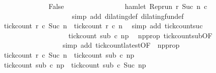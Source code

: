 \begin{isabellebody}
\ \ \ \ \ \ \ \ \ \ \ \ \isamarkupfalse%
\ False\ %
\isanewline
\ \ \ \ \ \ \ \ \ \ \ \ \ \ \isamarkupfalse%
\ {\isacartoucheopen}{\isasymnot}hamlet\ {\isacharparenleft}{\isacharparenleft}Rep{\isacharunderscore}run\ r{\isacharparenright}\ {\isacharparenleft}Suc\ n{\isacharparenright}\ c\isanewline
\ \ \ \ \ \ \ \ \ \ \ \ \ \ \ \ \isamarkupfalse%
\ {\isacharasterisk}\ \isamarkupfalse%
\ {\isacharparenleft}simp\ add{\isacharcolon}\ dilating{\isacharunderscore}def\ dilating{\isacharunderscore}fun{\isacharunderscore}def{\isacharparenright}\isanewline
\ \ \ \ \ \ \ \ \ \ \ \ \ \ \isamarkupfalse%
\ {\isacartoucheopen}tick{\isacharunderscore}count\ r\ c\ {\isacharparenleft}Suc\ n{\isacharparenright}\ {\isacharequal}\ tick{\isacharunderscore}count\ r\ c\ n{\isacartoucheclose}\ \isamarkupfalse%
\ {\isacharparenleft}simp\ add{\isacharcolon}\ tick{\isacharunderscore}count{\isacharunderscore}suc{\isacharparenright}\isanewline
\ \ \ \ \ \ \ \ \ \ \ \ \ \ \isamarkupfalse%
\ \isamarkupfalse%
\ {\isacartoucheopen}{\isachardot}{\isachardot}{\isachardot}\ {\isacharequal}\ tick{\isacharunderscore}count\ sub\ c\ n\isactrlsub p{\isacartoucheclose}\ \isamarkupfalse%
\ np{\isacharunderscore}prop\ tick{\isacharunderscore}count{\isacharunderscore}sub{\isacharbrackleft}OF\ {\isacharasterisk}{\isacharbrackright}\isanewline
\ \ \ \ \ \ \ \ \ \ \ \ \ \ \ \ \isamarkupfalse%
\ {\isacharparenleft}simp\ add{\isacharcolon}\ tick{\isacharunderscore}count{\isacharunderscore}latest{\isacharbrackleft}OF\ {\isacharasterisk}\ np{\isacharunderscore}prop{\isacharbrackright}{\isacharparenright}\isanewline
\ \ \ \ \ \ \ \ \ \ \ \ \ \ \isamarkupfalse%
\ \isamarkupfalse%
\ {\isacartoucheopen}tick{\isacharunderscore}count\ r\ c\ {\isacharparenleft}Suc\ n{\isacharparenright}\ {\isacharequal}\ tick{\isacharunderscore}count\ sub\ c\ n\isactrlsub p{\isacartoucheclose}\ \isacommand{{\isachardot}}\isamarkupfalse%
\isanewline
\ \ \ \ \ \ \ \ \ \ \ \ \ \ \isamarkupfalse%
\ \isamarkupfalse%
\ {\isacartoucheopen}tick{\isacharunderscore}count\ sub\ c\ n\isactrlsub p\ {\isasymle}\ tick{\isacharunderscore}count\ sub\ c\ {\isacharparenleft}Suc\ n\isactrlsub p{\isacharparenright}{\isacartoucheclose}\isanewline

\end{isabellebody}
